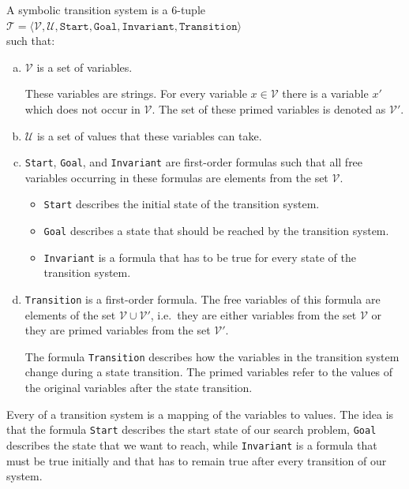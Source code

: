 \begin{Definition}
  A symbolic transition system is a 6-tuple
  \\[0.2cm]
  \hspace*{1.3cm}
  $\mathcal{T} = \langle \mathcal{V}, \mathcal{U}, \mathtt{Start}, \mathtt{Goal}, \mathtt{Invariant}, \mathtt{Transition} \rangle$
  \\[0.2cm]
  such that:
  \begin{enumerate}[(a)]
  \item $\mathcal{V}$ is a set of variables.

        These variables are strings.  For every variable $x \in \mathcal{V}$ there is a 
        variable $x'$ which does not occur in $\mathcal{V}$.  The set of these primed variables is denoted as
        $\mathcal{V}'$.
  \item $\mathcal{U}$ is a set of values that these variables can take.
  \item \texttt{Start}, \texttt{Goal}, and \texttt{Invariant} are first-order formulas such that all free
         variables occurring in these formulas are elements from the set $\mathcal{V}$.
         \begin{itemize}
         \item \texttt{Start} describes the initial state of the transition system.
         \item \texttt{Goal} describes a state that should be reached by the transition system.
         \item \texttt{Invariant} is a formula that has to be true for every state of the transition system.
         \end{itemize}
  \item \texttt{Transition} is a first-order formula.  The free variables of this formula are elements of
        the set $\mathcal{V} \cup \mathcal{V}'$, i.e.~they are either variables from the set $\mathcal{V}$
        or they are primed variables from the set $\mathcal{V}'$.

        The formula \texttt{Transition} describes how the variables in the transition system change during a
        state transition.  The primed variables refer to the values of the original variables after the
        state transition.
  \end{enumerate}
\end{Definition}
Every  of a transition system is a mapping of the variables to values.
The idea is that the formula \texttt{Start} describes the start state of our search problem, \texttt{Goal}
describes the state that we want to reach, while \texttt{Invariant} is a formula that must be true initially
and that has to remain true after every transition of our system.


